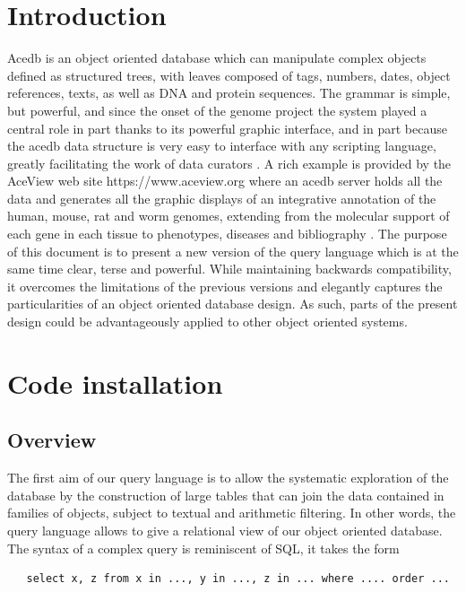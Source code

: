 \documentclass[11pt]{article}
\newcommand{\BL}{\begin{lstlisting}}
\begin{document}
%\vfill\eject
%\addtolength{\parskip}{2mm}

\newpage
\tableofcontents
\newpage

%%%%%%%%%%%%%%%%%%%%%%%%%%%%%%%%%%%%%%%%%%%%%%%%%%%%%%%%%%%%%%%%
% SECTION
%%%%%%%%%%%%%%%%%%%%%%%%%%%%%%%%%%%%%%%%%%%%%%%%%%%%%%%%%%%%%%%%
\section{Introduction}
Acedb \cite{DTM94} is an object oriented database which can manipulate complex objects defined as structured trees, 
with leaves composed of tags, numbers, dates, object references, texts, as well as DNA and protein sequences. 
The grammar is simple, but powerful, and since the onset of the genome project the system played a central role in part thanks to
its powerful graphic interface, and in part because the acedb data structure is very easy to interface
with any scripting language, greatly facilitating the work of data curators \cite{DTM92}. A rich example is provided by the  AceView 
web site https://www.aceview.org where an acedb server holds all the data
and generates all the graphic displays of an integrative annotation of the human, mouse, rat and worm genomes,
extending from the molecular support of each gene in each tissue to phenotypes, diseases and bibliography \cite{cDNA} . 
The purpose of this document is to present a new version of the query language
which is at the same time clear, terse and powerful. While maintaining backwards
compatibility, it overcomes the limitations of the previous versions and elegantly
captures the particularities of an object oriented database design. As such, parts of the present
design could be advantageously applied to other object oriented systems.
\label{sec1}


%%%%%%%%%%%%%%%%%%%%%%%%%%%%%%%%%%%%%%%%%%%%%%%%%%%%%%%%%%%%%%%%
% SECTION
%%%%%%%%%%%%%%%%%%%%%%%%%%%%%%%%%%%%%%%%%%%%%%%%%%%%%%%%%%%%%%%%
\section{Code installation}
\subsection{Overview}

The first aim of our query language is to allow the systematic exploration of the database
by the construction of large tables that can join the data contained in families of objects,
subject to textual and arithmetic filtering. In other words, the query language
allows to give a relational view of our object oriented database. 
The syntax of a complex query is reminiscent of SQL, it takes the form
\BL
   select x, z from x in ..., y in ..., z in ... where .... order ...
\end{lstlisting}
\end{document}
